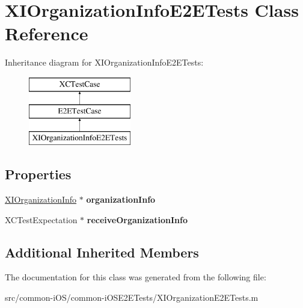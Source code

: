 \hypertarget{interface_x_i_organization_info_e2_e_tests}{}\section{X\+I\+Organization\+Info\+E2\+E\+Tests Class Reference}
\label{interface_x_i_organization_info_e2_e_tests}
Inheritance diagram for X\+I\+Organization\+Info\+E2\+E\+Tests\+:\begin{figure}[H]
\begin{center}
\leavevmode
\includegraphics[height=3.000000cm]{interface_x_i_organization_info_e2_e_tests}
\end{center}
\end{figure}
\subsection*{Properties}
\begin{DoxyCompactItemize}
\item 
\hypertarget{interface_x_i_organization_info_e2_e_tests_a9d2f651f86efcbc370811bac64969f32}{}\label{interface_x_i_organization_info_e2_e_tests_a9d2f651f86efcbc370811bac64969f32} 
\hyperlink{class_x_i_organization_info}{X\+I\+Organization\+Info} $\ast$ {\bfseries organization\+Info}
\item 
\hypertarget{interface_x_i_organization_info_e2_e_tests_af5e909aa279d6518aebaddf6a46a9aa1}{}\label{interface_x_i_organization_info_e2_e_tests_af5e909aa279d6518aebaddf6a46a9aa1} 
X\+C\+Test\+Expectation $\ast$ {\bfseries receive\+Organization\+Info}
\end{DoxyCompactItemize}
\subsection*{Additional Inherited Members}


The documentation for this class was generated from the following file\+:\begin{DoxyCompactItemize}
\item 
src/common-\/i\+O\+S/common-\/i\+O\+S\+E2\+E\+Tests/X\+I\+Organization\+E2\+E\+Tests.\+m\end{DoxyCompactItemize}
